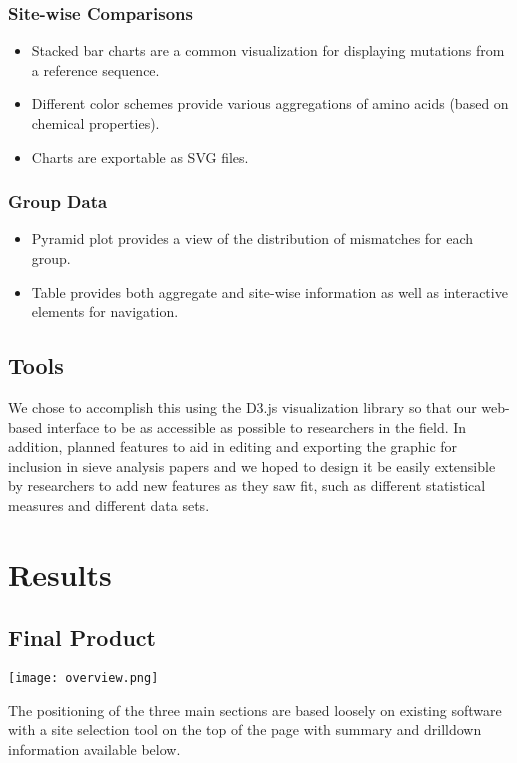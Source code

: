 \documentclass[5pt,clinic]{hmcposter}
\begin{document}
\begin{poster}
\subsubsection{Site-wise Comparisons}

\begin{itemize}
\item Stacked bar charts are a common visualization for displaying mutations from a reference sequence.
\item Different color schemes provide various aggregations of amino acids (based on chemical properties).
\item Charts are exportable as SVG files.
\end{itemize}

\subsubsection{Group Data}

\begin{itemize}
\item Pyramid plot provides a view of the distribution of mismatches for each group.
\item Table provides both aggregate and site-wise information as well as interactive elements for navigation.
\end{itemize}


\subsection{Tools}
We chose to accomplish this using the D3.js visualization library so that our web-based interface to be as accessible as possible to researchers in the field. In addition, planned features to aid in editing and exporting the graphic for inclusion in sieve analysis papers and we hoped to design it be easily extensible by researchers to add new features as they saw fit, such as different statistical measures and different data sets.


\section{Results}

\subsection{Final Product}

\begin{center}
\texttt{[image: overview.png]}
\end{center}
The positioning of the three main sections are based loosely on existing software with a site selection tool on the top of the page with summary and drilldown information available below.








\end{poster}
\end{document}
